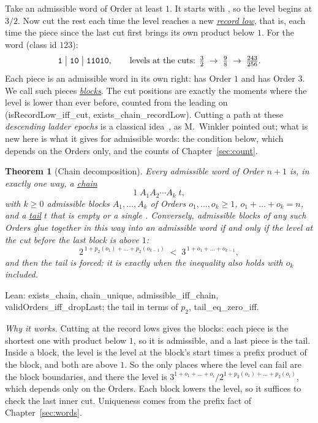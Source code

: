 \documentclass[11pt,a4paper,titlepage]{article}
\makeatletter
\newcommand{\termhere}[1]{\leavevmode
  \Hy@raisedlink{\hyper@anchorstart{term:#1}\hyper@anchorend}}
\newcommand{\keyterm}[2]{\hyperlink{box:#1}{\emph{#2}}}
\newcommand{\lean}[1]{\textsf{#1}}
\newtheorem{theorem}{Theorem}
\makeatother
\begin{document}
\termhere{recordlow}Take an admissible word of Order at least $1$. It starts with , so the level
begins at $3/2$. Now cut the rest each time the level reaches a new \keyterm{recordlow}{record
low}, that is, each time the piece since the last cut first brings its own
product below $1$. For the word  (class id $123$):
\[
\text{\texttt{1}} \;\big|\; \text{\texttt{10}} \;\big|\; \text{\texttt{11010}},
\qquad
\text{levels at the cuts: } \tfrac32 \;\to\; \tfrac98 \;\to\; \tfrac{243}{256}.
\]
\termhere{block}Each piece is an admissible word in its own right:  has Order $1$ and
 has Order $3$. We call such pieces \keyterm{block}{blocks}. The cut positions
are exactly the moments where the level is lower than ever before, counted from the
leading  on
(\lean{isRecordLow\_iff\_cut}, \lean{exists\_chain\_recordLow}). Cutting a
path at these \emph{descending ladder epochs} is a classical
idea~\cite{Feller1971}, as M.~Winkler pointed out; what is new here is what it gives for admissible words:
the condition below, which depends on the Orders only, and the counts of
Chapter~\ref{sec:count}.

\begin{theorem}[Chain decomposition]
\label{thm:chain}
\termhere{chain}Every admissible word of Order $n+1$ is, in exactly one way, a \keyterm{chain}{chain}
\[
1 \; A_1 A_2 \cdots A_k \; t,
\]
\termhere{tail}with $k \ge 0$ admissible blocks $A_1, \dots, A_k$ of Orders $o_1, \dots, o_k \ge 1$,
$o_1 + \dots + o_k = n$, and a \keyterm{tail}{tail} $t$ that is empty or a single .
Conversely, admissible blocks of any such Orders glue together in this way into an
admissible word if and only if the level at the cut before the last block is above $1$:
\[
2^{\,1 + p_2(o_1) + \dots + p_2(o_{k-1})} \;<\; 3^{\,1 + o_1 + \dots + o_{k-1}},
\]
and then the tail is forced: it is  exactly when the inequality also holds
with $o_k$ included.
\end{theorem}
Lean: \lean{exists\_chain}, \lean{chain\_unique}, \lean{admissible\_iff\_chain},
\lean{validOrders\_iff\_dropLast}; the tail in terms of $p_2$, \lean{tail\_eq\_zero\_iff}.

\medskip
\emph{Why it works.} Cutting at the record lows gives the blocks: each piece is the
shortest one with product below $1$, so it is admissible, and a last piece  is
the tail. Inside a block, the level is the level at the block's start
times a prefix product of the block, and both are above $1$. So the only places
where the level can fail are the block boundaries, and there the level is
$3^{1+o_1+\dots+o_i}/2^{1+p_2(o_1)+\dots+p_2(o_i)}$, which depends only on the
Orders. Each block lowers the level, so it suffices to check the last inner
cut. Uniqueness comes from the prefix fact of Chapter~\ref{sec:words}.
\end{document}
